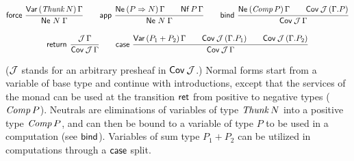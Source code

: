 \documentclass[a4paper]{easychair}
\begin{document}
\begin{small}
\begin{gather*}
  \nru{\tforce}{\VarP {\Thunk N} \Gamma}{\Ne N \Gamma}
\qquad
  \nru{\tapp}
      {\NeP {P \To N} \Gamma \qquad \PValNf P \Gamma}
      {\Ne N \Gamma}
\qquad
  \nru{\tbind}
      {\NeP {\Comp P} \Gamma \qquad \Cover \J (\cext \Gamma P)}
      {\Cover \J \Gamma}
\\[2ex]
  \nru{\treturn}{\J\,\Gamma}{\Cover \J \Gamma}
\qquad
  \nru{\tcase}
      {\VarP {P_1 + P_2} \Gamma
       \qquad \Cover \J (\cext \Gamma {P_1})
       \qquad \Cover \J (\cext \Gamma {P_2})
      }
      {\Cover \J \Gamma}
\end{gather*}
\end{small}
\noindent
($\mathcal{J}$ stands for an arbitrary presheaf in $\mathsf{Cov}^{}\,\mathcal{J}$.)
Normal forms start from a variable of base type and continue with
introductions,
except that the services of the monad can be used at the
transition $\mathsf{ret}$ from positive to negative types ($\mathit{Comp}\,P$).
Neutrals are eliminations of variables of type $\mathit{Thunk}\,N$ into a
positive type $\mathit{Comp}\,P$, and can then be bound
to a variable of type $P$ to be used in a computation (see $\mathsf{bind}$).
Variables of
sum type $P_1 + P_2$ can be utilized in computations through a
$\mathsf{case}$ split.
\end{document}
